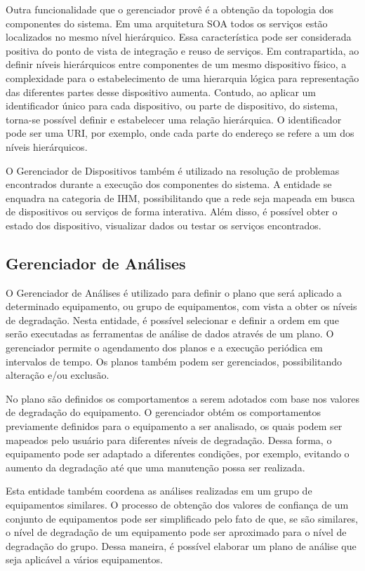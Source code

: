 Outra funcionalidade que o gerenciador provê é a obtenção da topologia dos componentes do sistema.
Em uma arquitetura \gls{SOA} todos os serviços estão localizados no mesmo nível hierárquico. Essa
característica pode ser considerada positiva do ponto de vista de integração e reuso de serviços. Em
contrapartida, ao definir níveis hierárquicos entre componentes de um mesmo dispositivo físico, a
complexidade para o estabelecimento de uma hierarquia lógica para representação das diferentes
partes desse dispositivo aumenta. Contudo, ao aplicar um identificador único para cada dispositivo,
ou parte de dispositivo, do sistema, torna-se possível definir e estabelecer uma relação
hierárquica. O identificador pode ser uma \gls{URI}, por exemplo, onde cada parte do endereço se
refere a um dos níveis hierárquicos.

O Gerenciador de Dispositivos também é utilizado na resolução de problemas encontrados durante a
execução dos componentes do sistema. A entidade se enquadra na categoria de \gls{IHM},
possibilitando que a rede seja mapeada em busca de dispositivos ou serviços de forma interativa.
Além disso, é possível obter o estado dos dispositivo, visualizar dados ou testar os serviços
encontrados.


\subsection{Gerenciador de Análises}
\label{sub:proposta-gerenciador-analises}

O Gerenciador de Análises é utilizado para definir o plano que será aplicado a determinado
equipamento, ou grupo de equipamentos, com vista a obter os níveis de degradação.
Nesta entidade, é possível selecionar e definir a ordem em que serão executadas as ferramentas de
análise de dados através de um plano. O gerenciador permite o agendamento dos planos e a execução
periódica em intervalos de tempo. Os planos também podem ser gerenciados, possibilitando alteração
e/ou exclusão.

No plano são definidos os comportamentos a serem adotados com base nos valores de degradação do
equipamento. O gerenciador obtém os comportamentos previamente definidos para o equipamento a ser
analisado, os quais podem ser mapeados pelo usuário para diferentes níveis de degradação. Dessa
forma, o equipamento pode ser adaptado a diferentes condições, por exemplo, evitando o aumento da
degradação até que uma manutenção possa ser realizada.

Esta entidade também coordena as análises realizadas em um grupo de equipamentos similares. O
processo de obtenção dos valores de confiança de um conjunto de equipamentos pode ser simplificado
pelo fato de que, se são similares, o nível de degradação de um equipamento pode ser aproximado para
o nível de degradação do grupo. Dessa maneira, é possível elaborar um plano de análise que seja
aplicável a vários equipamentos.


